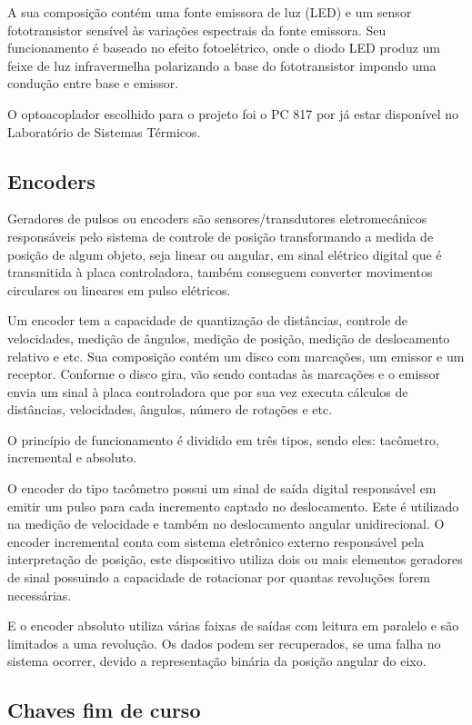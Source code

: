 A sua composição contém uma fonte emissora de luz (LED) e um sensor fototransistor sensível às variações 
espectrais da fonte emissora. Seu funcionamento é baseado no efeito fotoelétrico, onde o diodo LED produz 
um feixe de luz infravermelha polarizando a base do fototransistor impondo uma condução entre base e emissor.

O optoacoplador escolhido para o projeto foi o PC 817 por já estar disponível no Laboratório de Sistemas 
Térmicos.

\subsection{Encoders}\label{subsec:metencoder}

Geradores de pulsos ou encoders são sensores/transdutores eletromecânicos responsáveis pelo sistema de 
controle de posição transformando a medida de posição de algum objeto, seja linear ou angular, em sinal 
elétrico digital que é transmitida à placa controladora, também conseguem converter movimentos circulares 
ou lineares em pulso elétricos.

Um encoder tem a capacidade de quantização de distâncias, controle de velocidades, medição de ângulos, 
medição de posição, medição de deslocamento relativo e etc. Sua composição contém um disco com marcações, 
um emissor e um receptor. Conforme o disco gira, vão sendo contadas às marcações e o emissor envia um sinal 
à placa controladora que por sua vez executa cálculos de distâncias, velocidades, ângulos, número de rotações 
e etc.

O princípio de funcionamento é dividido em três tipos, sendo eles: tacômetro, incremental e absoluto.

O encoder do tipo tacômetro possui um sinal de saída digital responsável em emitir um pulso para cada 
incremento captado no deslocamento. Este é utilizado na medição de velocidade e também no deslocamento 
angular unidirecional. O encoder incremental conta com sistema eletrônico externo responsável pela 
interpretação de posição, este dispositivo utiliza dois ou mais elementos geradores de sinal possuindo 
a capacidade de rotacionar por quantas revoluções forem necessárias.

E o encoder absoluto utiliza várias faixas de saídas com leitura em paralelo e são limitados a uma revolução. 
Os dados podem ser recuperados, se uma falha no sistema ocorrer, devido a representação binária da posição 
angular do eixo.

\subsection{Chaves fim de curso}\label{subsec:metchaves}

